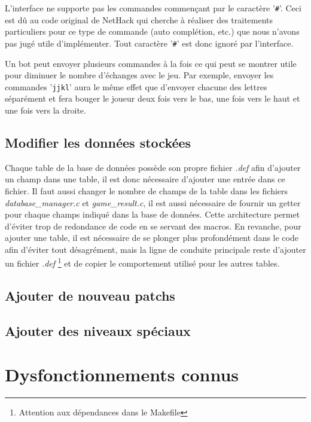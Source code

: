 \documentclass[10pt,a4paper]{report}
\begin{document}
L'interface ne supporte pas les commandes commençant par le caractère '\verb!#!'. Ceci est dû au code original de NetHack qui cherche à réaliser des traitements particuliers pour ce type de commande (auto complétion, etc.) que nous n'avons pas jugé utile d'implémenter. Tout caractère '\verb!#!' est donc ignoré par l'interface.

Un bot peut envoyer plusieurs commandes à la fois ce qui peut se montrer utile pour diminuer le nombre d'échanges avec le jeu. Par exemple, envoyer les commandes '\verb!jjkl!' aura le même effet que d'envoyer chacune des lettres séparément et fera bouger le joueur deux fois vers le bas, une fois vers le haut et une fois vers la droite.

\section{Modifier les données stockées}
Chaque table de la base de données possède son propre fichier \emph{.def} afin
d'ajouter un champ dans une table, il est donc nécessaire d'ajouter une entrée
dans ce fichier. Il faut aussi changer le nombre de champs de la table dans les
fichiers \emph{database\_manager.c} et \emph{game\_result.c}, il est aussi
nécessaire de fournir un getter pour chaque champs indiqué dans la base de
données. Cette architecture permet d'éviter trop de redondance de code en se
servant des macros. En revanche, pour ajouter une table, il est nécessaire de se
plonger plus profondément dans le code afin d'éviter tout désagrément, mais la
ligne de conduite principale reste d'ajouter un fichier \emph{.def}
\footnote{Attention aux dépendances dans le Makefile} et de copier le
comportement utilisé pour les autres tables.

\section{Ajouter de nouveau patchs}

\section{Ajouter des niveaux spéciaux}

\chapter{Dysfonctionnements connus}
\end{document}
